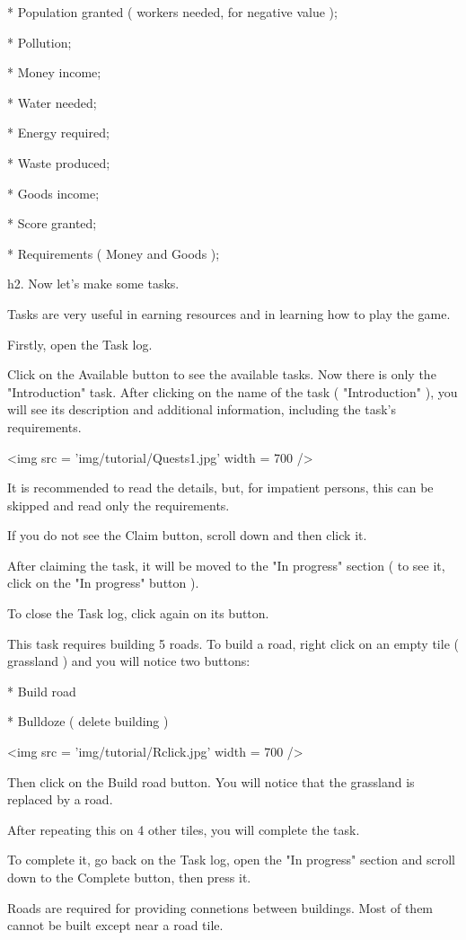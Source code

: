 * Population granted ( workers needed, for negative value );

* Pollution;

* Money income;

* Water needed;

* Energy required;

* Waste produced;

* Goods income;

* Score granted;

* Requirements ( Money and Goods );

h2. Now let's make some tasks.

Tasks are very useful in earning resources and in learning how to play the game.

Firstly, open the Task log.

Click on the Available button to see the available tasks. Now there is only the "Introduction" task. After clicking on the name of the task ( "Introduction" ), you will see its description and additional information, including the task's requirements.

<img src = 'img/tutorial/Quests1.jpg' width = 700 />

It is recommended to read the details, but, for impatient persons, this can be skipped and read only the requirements.

If you do not see the Claim button, scroll down and then click it.

After claiming the task, it will be moved to the "In progress" section ( to see it, click on the "In progress" button ).

To close the Task log, click again on its button.

This task requires building 5 roads. To build a road, right click on an empty tile ( grassland ) and you will notice two buttons:

* Build road

* Bulldoze ( delete building )

<img src = 'img/tutorial/Rclick.jpg' width = 700 />

Then click on the Build road button. You will notice that the grassland is replaced by a road.

After repeating this on 4 other tiles, you will complete the task.

To complete it, go back on the Task log, open the "In progress" section and scroll down to the Complete button, then press it.

Roads are required for providing connetions between buildings. Most of them cannot be built except near a road tile.

